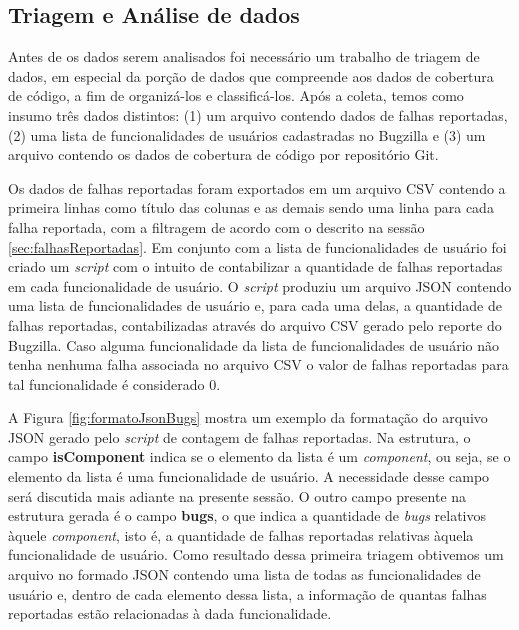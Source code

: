 \documentclass[11.5pt]{article}
\begin{document}

\subsection{Triagem e Análise de dados} \label{sec:triagem}

Antes de os dados serem analisados foi necessário um trabalho de triagem de dados, em especial da
porção de dados que compreende aos dados de cobertura de código, a fim de organizá-los e
classificá-los.
Após a coleta, temos como insumo três dados distintos:
(1) um arquivo contendo dados de falhas reportadas,
(2) uma lista de funcionalidades de usuários cadastradas no Bugzilla e
(3) um arquivo contendo os dados de cobertura de código por repositório Git.

Os dados de falhas reportadas foram exportados em um arquivo CSV contendo a primeira linhas como
título das colunas e as demais sendo uma linha para cada falha reportada, com a filtragem de acordo
com o descrito na sessão \ref{sec:falhasReportadas}.
Em conjunto com a lista de funcionalidades de usuário foi criado um \textit{script} com o intuito
de contabilizar a quantidade de falhas reportadas em cada funcionalidade de usuário.
O \textit{script} produziu um arquivo JSON
contendo uma lista de funcionalidades de usuário e, para cada uma delas, a quantidade de falhas
reportadas, contabilizadas através do arquivo CSV gerado pelo reporte do Bugzilla. Caso alguma
funcionalidade da lista de funcionalidades de usuário não tenha nenhuma falha associada no arquivo
CSV o valor de falhas reportadas para tal funcionalidade é considerado 0.

A Figura \ref{fig:formatoJsonBugs} mostra um exemplo da formatação do arquivo JSON gerado pelo
\textit{script} de contagem de falhas reportadas.
Na estrutura, o campo \textbf{isComponent} indica se o elemento da lista é um \textit{component},
ou seja, se o elemento da lista é uma funcionalidade de usuário.
A necessidade desse campo será discutida mais adiante na presente sessão.
O outro campo presente na estrutura gerada é o campo \textbf{bugs}, o que indica a quantidade de
\textit{bugs} relativos àquele \textit{component}, isto é, a quantidade de falhas reportadas
relativas àquela funcionalidade de usuário.
Como resultado dessa primeira triagem obtivemos um arquivo no formado JSON contendo uma lista de
todas as funcionalidades de usuário e, dentro de cada elemento dessa lista, a informação de quantas
falhas reportadas estão relacionadas à dada funcionalidade.
\end{document}
